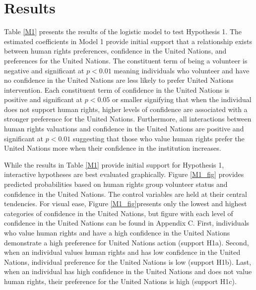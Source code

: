 \documentclass[12pt]{article}
\newcommand{\UN}[1]{United Nations}
\begin{document}
\section*{Results}

\begin{centering}

\end{centering}

Table \ref{M1} presents the results of the logistic model to test Hypothesis 1. The estimated coefficients in Model 1 provide initial support that a relationship exists between human rights preferences, confidence in the United Nations, and preferences for the \UN{}. The constituent term of being a volunteer is negative and significant at $p < 0.01$ meaning individuals who volunteer and have no confidence in the \UN{} are less likely to prefer \UN{} intervention. Each constituent term of confidence in the \UN{} is positive and significant at $p < 0.05$ or smaller signifying that when the individual does not support human rights, higher levels of confidence are associated with a stronger preference for the \UN{}. Furthermore, all interactions between human rights valuations and confidence in the \UN{} are positive and significant at $p < 0.01$ suggesting that those who value human rights prefer the \UN{} more when their confidence in the institution increases. 

While the results in Table \ref{M1} provide initial support for Hypothesis 1, interactive hypotheses are best evaluated graphically. Figure \ref{M1_fig} provides predicted probabilities based on human rights group volunteer status and confidence in the \UN{}. The control variables are held at their central tendencies. For visual ease, Figure \ref{M1_fig}\footnotemark[11] presents only the lowest and highest categories of confidence in the \UN{}, but figure with each level of confidence in the \UN{} can be found in Appendix C. First, individuals who value human rights and have a high confidence in the \UN{} demonstrate a high preference for \UN{} action (support H1a). Second, when an individual values human rights and has low confidence in the \UN{}, individual preference for the \UN{} is low (support H1b). Last, when an individual has high confidence in the \UN{} and does not value human rights, their preference for the \UN{} is high (support H1c). 
\end{document}
